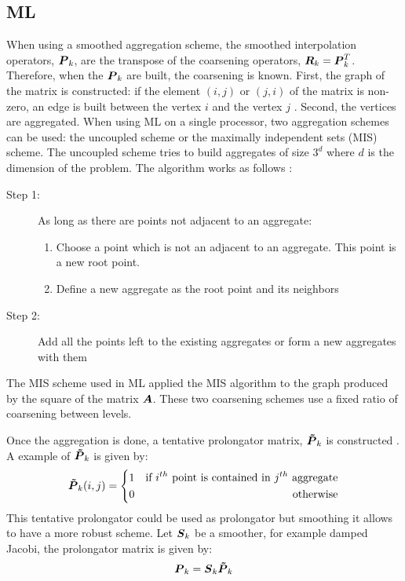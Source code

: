 \subsection{ML}
When using a smoothed aggregation scheme, the smoothed interpolation operators,
$\boldsymbol{P}_k$, are the transpose of the coarsening operators,
$\boldsymbol{R}_k=\boldsymbol{P}_k^T$. Therefore, when the $\boldsymbol{P}_k$ are built, the
coarsening is known. First, the graph of the matrix is constructed: if the element
$(i,j)$ or $(j,i)$ of the matrix is non-zero, an edge is built between the
vertex $i$ and the vertex $j$ \cite{ml_guide}. Second, the vertices are
aggregated. When using ML on a single processor, two aggregation schemes can
be used: the uncoupled scheme or the maximally independent sets (MIS) scheme. 
The uncoupled scheme tries to build aggregates of size $3^d$ where $d$ is the
dimension of the problem. The algorithm works as follows \cite{mis}:
\begin{description}
  \item[Step 1:] As long as there are points not adjacent to an aggregate:
    \begin{enumerate}
      \item Choose a point which is not an adjacent to an
        aggregate. This point is a new root point.
      \item Define a new aggregate as the root point and its neighbors 
    \end{enumerate}
  \item[Step 2:] Add all the points left to the existing aggregates or form a
    new aggregates with them
\end{description}
The MIS scheme used in ML applied the MIS algorithm \cite{graph_coloring} to
the graph produced by the square of the matrix $\boldsymbol{A}$. These two coarsening 
schemes use a fixed ratio of coarsening between levels. 

Once the aggregation is done, a tentative prolongator matrix, $\boldsymbol{\tilde{P}}_k$ 
is constructed \cite{mis}. A example of $\boldsymbol{\tilde{P}}_k$ is given by:
\begin{equation}
  \boldsymbol{\tilde{P}}_k(i,j) = \left\{
  \begin{aligned}
    &1 &\textrm{if }i^{th}\textrm{ point is contained in }j^{th}\textrm{
    aggregate}\\
    & 0 &\textrm{otherwise}
  \end{aligned}
  \right.
\end{equation}
This tentative prolongator could be used as prolongator but smoothing it
allows to have a more robust scheme. Let $\boldsymbol{S}_k$ be a smoother, for example
damped Jacobi, the prolongator matrix is given by:
\begin{equation}
  \boldsymbol{P}_k = \boldsymbol{S}_k \boldsymbol{\tilde{P}}_k
\end{equation}

